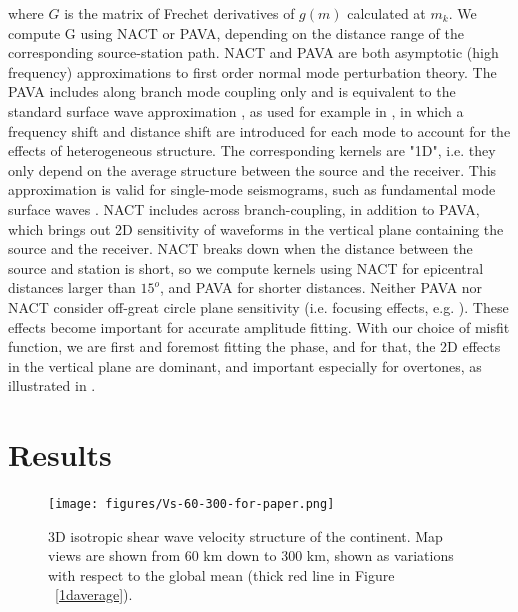 \documentclass[12pt]{article}
\begin{document}
\noindent where $G$ is the matrix of Frechet derivatives of $g(m)$ calculated at $m_k$. We compute G using NACT or PAVA, depending on the distance range of the corresponding source-station path.
NACT and PAVA are both asymptotic (high frequency) approximations to first order normal mode perturbation theory. 
The PAVA includes along branch mode coupling only and is equivalent to the standard surface wave approximation \citep[e.g][]{mochizuki1986free,romanowicz1987multiplet}, as used for example in \cite{woodhouse1984mapping}, in which a frequency shift and distance shift are introduced for each mode to account for the effects of heterogeneous structure. 
The corresponding kernels are "1D", i.e. they only depend on the average structure between the source and the receiver. This approximation is valid for single-mode seismograms, such as fundamental mode surface waves \citep[e.g][]{romanowicz2008computation}.
NACT includes across branch-coupling, in addition to PAVA, which brings out 2D sensitivity of waveforms in the vertical plane containing the source and the receiver. NACT breaks down when the distance between the source and station is short, so we compute kernels using NACT for epicentral distances larger than $15^o$, and PAVA for shorter distances.
Neither PAVA nor NACT consider off-great circle plane sensitivity (i.e. focusing effects, e.g. \cite{zhou2005finite}). These effects become important for accurate amplitude fitting. With our choice of misfit function, we are first and foremost fitting the phase, and for that, the 2D effects in the vertical plane are dominant, and important especially for overtones, as illustrated in \cite{megnin1999effects,romanowicz2008computation}.


\section{Results}

\begin{figure}[ht]
	\centering
	\texttt{[image: figures/Vs-60-300-for-paper.png]}

	\caption{\baselineskip 18pt
	3D isotropic shear wave velocity structure of the continent. Map views are shown from 60 km down to 300 km, shown as variations with respect to the global mean (thick red line in Figure ~\ref{1daverage}). 
	}

	\label{3d-VS}

\end{figure}
\end{document}
